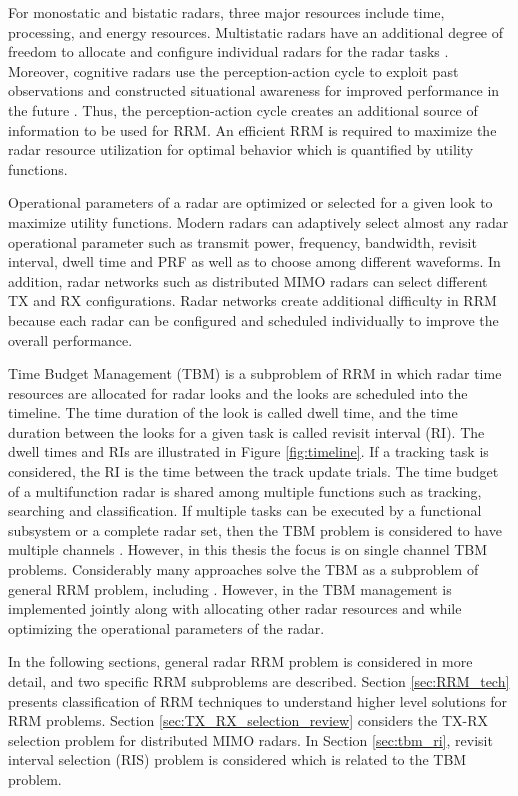 \documentclass[english, 12pt, a4paper, elec, utf8, a-1b, online]{aaltothesis}
\begin{document}
For monostatic and bistatic radars, three major resources include time, processing, and energy resources. 
Multistatic radars have an additional degree of freedom to allocate and configure individual radars for the radar tasks \cite{Moo2016}. 
Moreover, cognitive radars use the perception-action cycle to exploit past observations and constructed situational awareness for improved performance in the future \cite{Haykin2006}. 
Thus, the perception-action cycle creates an additional source of information to be used for RRM.
An efficient RRM is required to maximize the radar resource utilization for optimal behavior which is quantified by utility functions. 

Operational parameters of a radar are optimized or selected for a given look to maximize utility functions. 
Modern radars can adaptively select almost any radar operational parameter such as transmit power, frequency, bandwidth, revisit interval, dwell time and PRF as well as to choose among different waveforms.
In addition, radar networks such as distributed MIMO radars can select different TX and RX configurations. 
Radar networks create additional difficulty in RRM because each radar can be configured and scheduled individually to improve the overall performance.

Time Budget Management (TBM) is a subproblem of RRM in which radar time resources are allocated for radar looks and the looks are scheduled into the timeline. 
The time duration of the look is called dwell time, and the time duration between the looks for a given task is called revisit interval (RI). 
The dwell times and RIs are illustrated in Figure \ref{fig:timeline}. 
If a tracking task is considered, the RI is the time between the track update trials. 
The time budget of a multifunction radar is shared among multiple functions such as tracking, searching and classification.
If multiple tasks can be executed by a functional subsystem or a complete radar set, then the TBM problem is considered to have multiple channels \cite{Shaghaghi2018}.
However, in this thesis the focus is on single channel TBM problems.
Considerably many approaches solve the TBM as a subproblem of general RRM problem, including \cite{Koch1999, Wintenby2006, Byrne2016, Xu2010}. 
However, in \cite{Rajkumar1997, Irci2010, Charlish2015a} the TBM management is implemented jointly along with allocating other radar resources and while optimizing the operational parameters of the radar.


In the following sections, general radar RRM problem is considered in more detail, and two specific RRM subproblems are described.
Section \ref{sec:RRM_tech} presents classification of RRM techniques to understand higher level solutions for RRM problems.
Section \ref{sec:TX_RX_selection_review} considers the TX-RX selection problem for distributed MIMO radars. 
In Section \ref{sec:tbm_ri}, revisit interval selection (RIS) problem is considered which is related to the TBM problem.
\end{document}
